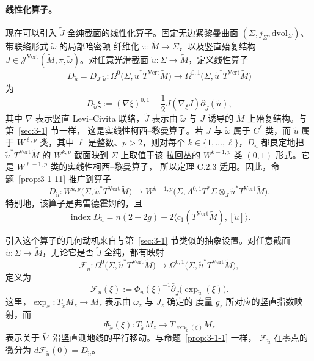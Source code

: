 \paragraph{线性化算子。}
现在可以引入 $\widetilde J$-全纯截面的线性化算子。固定无边紧黎曼曲面
$(\Sigma,j_\Sigma,\mathrm{dvol}_\Sigma)$、带联络形式 $\widetilde\omega$ 的局部哈密顿
纤维化 $\pi:\widetilde M\to\Sigma$，以及竖直殆复结构
$J\in\mathcal J^{\mathrm{Vert}}(\widetilde M,\pi,\widetilde\omega)$。对任意光滑截面
$\widetilde u:\Sigma\to\widetilde M$，定义线性算子
\[
  D_{\widetilde u}=D_{J,\widetilde u}:
  \Omega^0\bigl(\Sigma,\widetilde u^*T^{\mathrm{Vert}}\widetilde M\bigr)
  \longrightarrow
  \Omega^{0,1}\bigl(\Sigma,\widetilde u^*T^{\mathrm{Vert}}\widetilde M\bigr)
\]
为
\[
  D_{\widetilde u}\xi
  :=(\nabla\xi)^{0,1}
   -\frac12J(\nabla_\xi J)\partial_{\widetilde J}(\widetilde u),
\]
其中 $\nabla$ 表示竖直 Levi--Civita 联络，$\widetilde J$ 表示由
$\widetilde\omega$ 与 $J$ 诱导的 $\widetilde M$ 上殆复结构。与第~\ref{sec:3-1} 节一样，
这是实线性柯西--黎曼算子。若 $J$ 与 $\widetilde\omega$ 属于 $C^\ell$ 类，而
$\widetilde u$ 属于 $W^{\ell,p}$ 类，其中 $\ell$ 是整数、$p>2$，则对每个
$k\in\{1,\ldots,\ell\}$，$D_{\widetilde u}$ 都良定地把
$\widetilde u^*T^{\mathrm{Vert}}\widetilde M$ 的 $W^{k,p}$ 截面映到 $\Sigma$ 上取值于该
拉回丛的 $W^{k-1,p}$ 类 $(0,1)$-形式。它是 $W^{\ell-1,p}$ 类的实线性柯西--黎曼算子，
所以定理 C.2.3 适用。因此，命题~\ref{prop:3-1-11} 推广到算子
\[
  D_{\widetilde u}:
  W^{k,p}\bigl(\Sigma,\widetilde u^*T^{\mathrm{Vert}}\widetilde M\bigr)
  \longrightarrow
  W^{k-1,p}\bigl(\Sigma,
  \Lambda^{0,1}T^*\Sigma\otimes_J
  \widetilde u^*T^{\mathrm{Vert}}\widetilde M\bigr).
\]
特别地，该算子是弗雷德霍姆的，且
\[
  \operatorname{index}D_{\widetilde u}
  =n(2-2g)+2\bigl\langle c_1(T^{\mathrm{Vert}}\widetilde M),[\widetilde u]\bigr\rangle.
\]

\begin{remark}\label{rem:8-3-7}
引入这个算子的几何动机来自与第~\ref{sec:3-1} 节类似的抽象设置。对任意截面
$\widetilde u:\Sigma\to\widetilde M$，无论它是否 $\widetilde J$-全纯，都有映射
\[
  \mathcal F_{\widetilde u}:
  \Omega^0\bigl(\Sigma,\widetilde u^*T^{\mathrm{Vert}}\widetilde M\bigr)
  \longrightarrow
  \Omega^{0,1}\bigl(\Sigma,\widetilde u^*T^{\mathrm{Vert}}\widetilde M\bigr),
\]
定义为
\[
  \mathcal F_{\widetilde u}(\xi)
  :=\Phi_{\widetilde u}(\xi)^{-1}
  \bar\partial_{\widetilde J}\bigl(\exp_{\widetilde u}(\xi)\bigr).
\]
这里，$\exp_{\widetilde x}:T_{\widetilde x}M_z\to M_z$ 表示由 $\omega_z$ 与 $J_z$ 确定的
度量 $g_z$ 所对应的竖直指数映射，而
\[
  \Phi_{\widetilde x}(\xi):T_{\widetilde x}M_z
  \longrightarrow T_{\exp_{\widetilde x}(\xi)}M_z
\]
表示关于 $\widetilde\nabla$ 沿竖直测地线的平行移动。与命题~\ref{prop:3-1-1} 一样，
$\mathcal F_{\widetilde u}$ 在零点的微分为
$d\mathcal F_{\widetilde u}(0)=D_{\widetilde u}$。
\end{remark}

